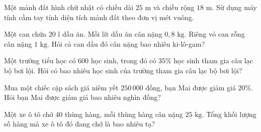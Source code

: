\begin{ex} %
Một mảnh đất hình chữ nhật có chiều dài $25\text{ m}$ và chiều rộng $18\text{ m}$. Sử dụng máy tính cầm tay tính diện tích mảnh đất theo đơn vị mét vuông.
\end{ex}

\begin{ex} %
Một can chứa $20\text{ l}$ dầu ăn. Mỗi lít dầu ăn cân nặng $0{,}8\text{ kg}$. Riêng vỏ can rỗng cân nặng $1\text{ kg}$. Hỏi cả can dầu đó cân nặng bao nhiêu ki-lô-gam?
\end{ex}

\begin{ex} %
Một trường tiểu học có $600$ học sinh, trong đó có $35\%$ học sinh tham gia câu lạc bộ bơi lội. Hỏi có bao nhiêu học sinh của trường tham gia câu lạc bộ bơi lội?
\end{ex}

\begin{ex} %
Mua một chiếc cặp sách giá niêm yết $250\,000$ đồng, bạn Mai được giảm giá $20\%$. Hỏi bạn Mai được giảm giá bao nhiêu nghìn đồng?
\end{ex}

\begin{ex} %
Một xe ô tô chở $40$ thùng hàng, mỗi thùng hàng cân nặng $25\text{ kg}$. Tổng khối lượng số hàng mà xe ô tô đó đang chở là bao nhiêu tạ?
\end{ex}
